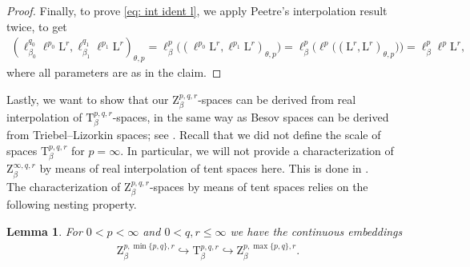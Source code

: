 \documentclass[11pt, leqno,parskip=half]{amsart}
\newtheorem{lemma}[theorem]{Lemma}
\theoremstyle{definition}
\renewcommand{\L}{\mathrm{L}}
\renewcommand{\T}{\mathrm{T}}
\newcommand{\Z}{\mathrm{Z}}
\numberwithin{equation}{section}
\begin{document}
\begin{proof}
    Finally, to prove \eqref{eq: int ident l}, we apply Peetre's interpolation result \cite[Chp.\@ 5, Thm.\@ 4, p.\@ 98]{Peetre} twice, to get
    \begin{align*}
        (\ell^{q_0}_{\beta_0}\ell^{p_0}\L^r , \ell^{q_1}_{\beta_1}\ell^{p_1}\L^r)_{\theta, p}  = \ell^p_\beta\big((\ell^{p_0}\L^r , \ell^{p_1}\L^r)_{\theta, p}\big) =  \ell^p_\beta\big( \ell^{p}\big((\L^r,\L^r)_{\theta, p}\big)\big) = \ell^{p}_{\beta}\ell^{p}\L^r,
    \end{align*}
    where all parameters are as in the claim.

\end{proof}

Lastly, we want to show that our $\Z^{p,q,r}_\beta$-spaces can be derived from real interpolation of $\T^{p,q,r}_\beta$-spaces, in the same way as Besov spaces can be derived from Triebel--Lizorkin spaces; see \cite[Thm.\@ 2.4.2]{Triebel1}. Recall that we did not define the scale of spaces $\T^{p,q,r}_\beta$ for $p=\infty$. In particular, we will not provide a characterization of $\Z^{\infty,q,r}_\beta$ by means of real interpolation of tent spaces here. This is done in \cite[Prop.~3.31]{Haardt}.\\

The characterization of $\Z^{p,q,r}_\beta$-spaces by means of tent spaces relies on the following nesting property.


\begin{lemma}
    For $0<p<\infty$ and $0< q, r\leq \infty$ we have the continuous embeddings
    \begin{align*}
         \Z^{p,\min\{p,q\},r}_\beta\hookrightarrow \T^{p,q,r}_\beta \hookrightarrow \Z^{p,\max\{p,q\},r}_\beta.
    \end{align*}
\end{lemma}
\end{document}
